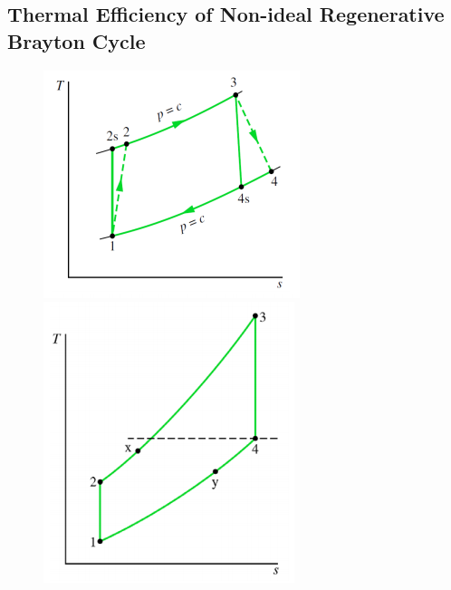 \documentclass[class=report, crop=false, 12pt,a4paper]{standalone}
\numberwithin{equation}{section}
\begin{document}
\subsection{Thermal Efficiency of Non-ideal Regenerative Brayton Cycle}
\begin{figure}[H]
  \begin{center}
    \begin{minipage}[b]{0.42\textwidth}
      \centering
      \includegraphics[width = 0.85 \textwidth]{../img/diagram167.png}
      \caption{}
    \end{minipage}
    \begin{minipage}[b]{0.42\textwidth}
      \centering
      \includegraphics[width = 0.85 \textwidth]{../img/diagram168.png}
      \caption{}
    \end{minipage}
  \end{center}
\end{figure}
\end{document}
